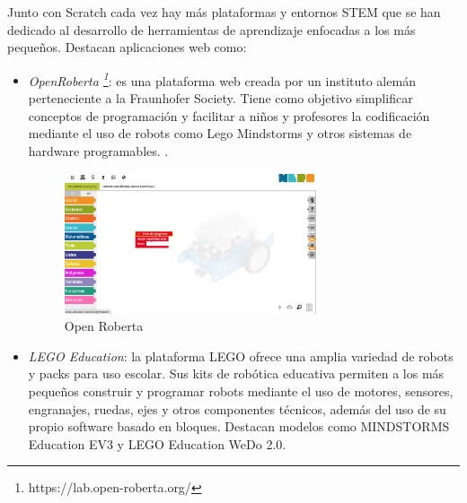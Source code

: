 Junto con Scratch cada vez hay más plataformas y entornos STEM que se han dedicado al desarrollo de herramientas de aprendizaje enfocadas a los más pequeños. Destacan aplicaciones web como: 

\begin{itemize}
    \item  \textit{OpenRoberta \footnote{https://lab.open-roberta.org/}}: es una plataforma web creada por un instituto alemán perteneciente a la Fraunhofer Society. Tiene como objetivo simplificar conceptos de programación y facilitar a niños y profesores la codificación mediante el uso de robots como Lego Mindstorms y otros sistemas de hardware programables. \cite{openroberta}. 
    
    \begin{figure}[H]
        \centering
        \includegraphics[width=0.7\textwidth ]{chapters/images/openrobert.png}
        \caption{Open Roberta}
        \label{fig:openroberta}
    \end{figure}
    \item \textit{LEGO Education}: la plataforma LEGO ofrece una amplia variedad de robots y packs para uso escolar. Sus kits de robótica educativa permiten a los más pequeños construir y programar robots mediante el uso de motores, sensores, engranajes, ruedas, ejes y otros componentes técnicos, además del uso de su propio software basado en bloques. Destacan modelos como  MINDSTORMS Education EV3 y LEGO Education WeDo 2.0.\cite{ev3} \cite{legoeducation}


\end{itemize}
